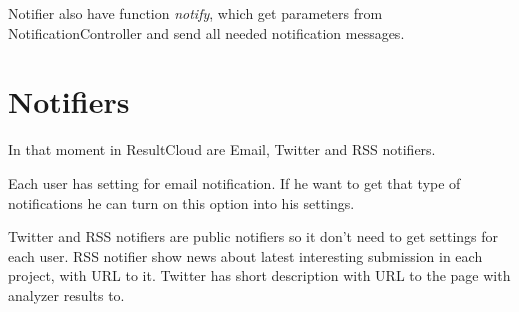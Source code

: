 Notifier also have function \emph{notify}, which get parameters from NotificationController and send all needed notification messages.

\chapter{Notifiers}

In that moment in ResultCloud are Email, Twitter and RSS notifiers.

Each user has setting for email notification. If he want to get that type of notifications he can turn on this option into his settings. 

Twitter and RSS notifiers are public notifiers so it don't need to get settings for each user. RSS notifier show news about latest interesting submission in each project, with URL to it. Twitter has short description with URL to the page with analyzer results to.
